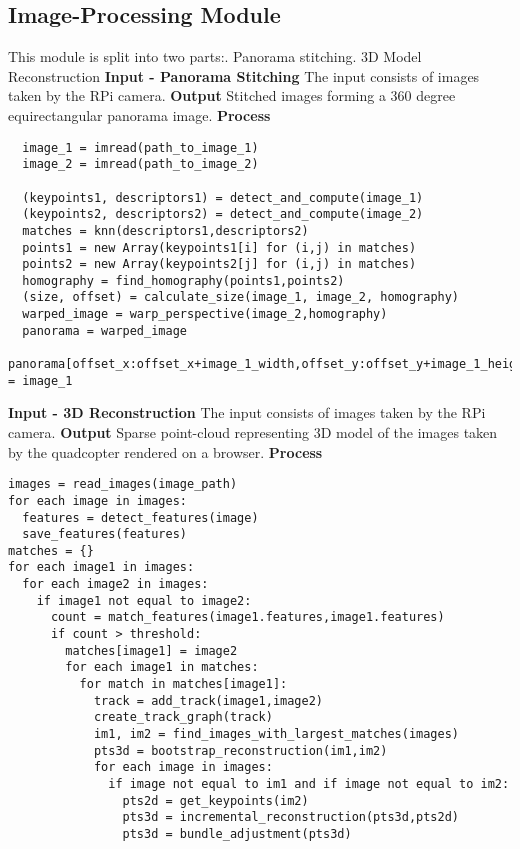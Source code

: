 \subsection{Image-Processing Module}
This module is split into two parts:. Panorama stitching. 3D Model Reconstruction\newline
\newline
\textbf{Input - Panorama Stitching}\newline
The input consists of images taken by the RPi camera.\newline
\textbf{Output}\newline
Stitched images forming a 360 degree equirectangular panorama image.\newline
\textbf{Process}\newline
\begin{lstlisting}
  image_1 = imread(path_to_image_1)
  image_2 = imread(path_to_image_2)

  (keypoints1, descriptors1) = detect_and_compute(image_1)
  (keypoints2, descriptors2) = detect_and_compute(image_2)
  matches = knn(descriptors1,descriptors2)
  points1 = new Array(keypoints1[i] for (i,j) in matches)
  points2 = new Array(keypoints2[j] for (i,j) in matches)
  homography = find_homography(points1,points2)
  (size, offset) = calculate_size(image_1, image_2, homography)
  warped_image = warp_perspective(image_2,homography)
  panorama = warped_image
  panorama[offset_x:offset_x+image_1_width,offset_y:offset_y+image_1_height] = image_1
\end{lstlisting}
\textbf{Input - 3D Reconstruction}\newline
The input consists of images taken by the RPi camera.\newline
\textbf{Output}\newline
Sparse point-cloud representing 3D model of the images taken by the quadcopter rendered on a browser.\newline
\textbf{Process}\newline
\begin{lstlisting}
images = read_images(image_path)
for each image in images:
  features = detect_features(image)
  save_features(features)
matches = {}
for each image1 in images:
  for each image2 in images:
    if image1 not equal to image2:
      count = match_features(image1.features,image1.features)
      if count > threshold:
        matches[image1] = image2
        for each image1 in matches:
          for match in matches[image1]:
            track = add_track(image1,image2)
            create_track_graph(track)
            im1, im2 = find_images_with_largest_matches(images)
            pts3d = bootstrap_reconstruction(im1,im2)
            for each image in images:
              if image not equal to im1 and if image not equal to im2:
                pts2d = get_keypoints(im2)
                pts3d = incremental_reconstruction(pts3d,pts2d)
                pts3d = bundle_adjustment(pts3d)
\end{lstlisting}

